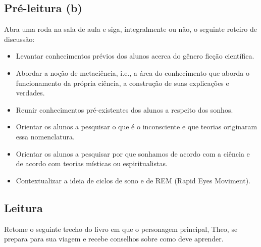 \documentclass[12pt]{extarticle}
\begin{document}
\subsection{Pré-leitura (b)}
Abra uma roda na sala de aula e siga, integralmente ou não, o seguinte roteiro de discussão:

\begin{itemize}
\item Levantar conhecimentos prévios dos alunos acerca do gênero ficção
científica.

\item Abordar a noção de metaciência, i.e., a área do conhecimento que aborda o
funcionamento da própria ciência, a construção de suas explicações e verdades.

\item Reunir conhecimentos pré-existentes dos alunos a respeito dos sonhos.

\item Orientar os alunos a pesquisar o que é o inconsciente e que teorias
originaram essa nomenclatura.

\item Orientar os alunos a pesquisar por que sonhamos de acordo com a ciência e de
acordo com teorias místicas ou espiritualistas.

\item Contextualizar a ideia de ciclos de sono e de REM (Rapid Eyes Moviment).
\end{itemize}


\subsection{Leitura}

  

Retome o seguinte trecho do livro em que o personagem principal, Theo, se
prepara para sua viagem e recebe conselhos sobre como deve aprender.  
\end{document}
